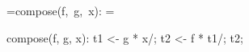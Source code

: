 =\hbox{\block compose(f, g, x):} = %
\begin{minipage}{\dimen0}
\begin{AVerb}[numbers=left]
\block compose(f, g, x): \label{mil_block_decl_fig1b}
  \vbinds t1 <- \app g * x/; \label{mil_gofx_fig1b}
  \vbinds t2 <- \app f * t1/; \label{mil_fofx_fig1b}
  \return t2; \label{mil_result_fig1b}
\end{AVerb}
\end{minipage}
